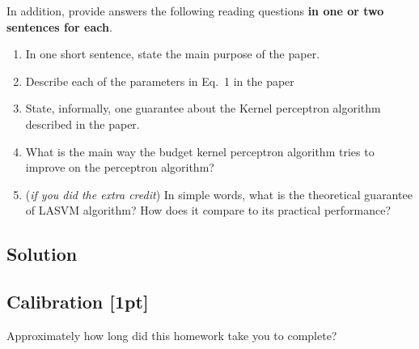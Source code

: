 \documentclass[submit]{harvardml}
\begin{document}
\begin{problem}
In addition, provide answers the following reading questions
{\bf in one or two sentences for each}.
%
\begin{enumerate}
\item In one short sentence, state the main purpose of the paper.
\item Describe each of the parameters in Eq.~1 in the paper
\item State, informally, one guarantee about the Kernel perceptron algorithm described in the
  paper. 
\item What is the main way the budget kernel perceptron algorithm tries to
  improve on the perceptron algorithm?
\item ({\em if you did the extra credit}) In simple words, what is the theoretical guarantee of LASVM algorithm? How
  does it compare to its practical performance?
\end{enumerate}


\end{problem}

\subsection*{Solution}



\newpage

\subsection*{Calibration [1pt]}
Approximately how long did this homework take you to complete?
\end{document}
